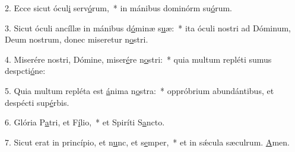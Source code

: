 2. Ecce sicut ócul\uline{i} serv\uline{ó}rum,~* in mánibus dominórm su\uline{ó}rum.\par 
3. Sicut óculi ancíllæ in mánibus d\uline{ó}minæ s\uline{u}æ:~* ita óculi nostri ad Dóminum, Deum nostrum, donec miseretur n\uline{o}stri.\par 
4. Miserére nostri, Dómine, miser\uline{é}re n\uline{o}stri:~* quia multum repléti sumus despcti\uline{ó}ne:\par 
5. Quia multum repléta est \uline{á}nima n\uline{o}stra:~* oppróbrium abundántibus, et despécti sup\uline{é}rbis.\par 
6. Glória P\uline{a}tri, et F\uline{í}lio,~* et Spiríti S\uline{a}ncto.\par 
7. Sicut erat in princípio, et n\uline{u}nc, et s\uline{e}mper,~* et in sǽcula sæculrum. \uline{A}men.\par 
